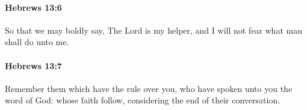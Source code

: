 		\paragraph{Hebrews 13:6} %
			\label{HEBREWS-13-6}

			So that we may boldly say, The Lord is my helper, and I will not fear what man shall do unto me.

			\begin{framed}
			\scriptsize
				\begin{compactdesc}
					\item[SBLG] 
				\end{compactdesc}
			\end{framed}

		\paragraph{Hebrews 13:7} %
			\label{HEBREWS-13-7}

			Remember them which have the rule over you, who have spoken unto you the word of God: whose faith follow, considering the end of their conversation.

